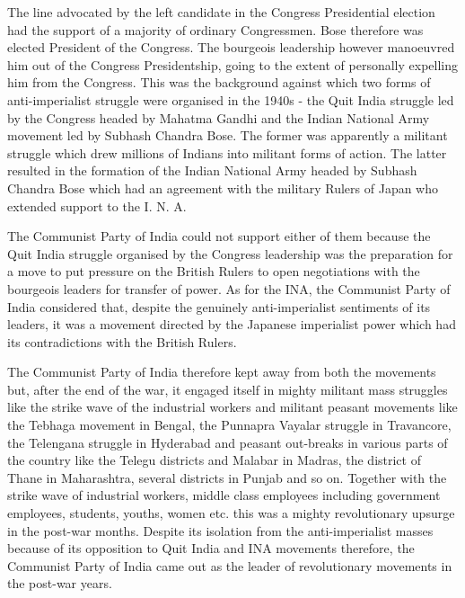 The line advocated by the left candidate in the Congress Presidential election had the support of a majority of ordinary Congressmen. Bose therefore was elected President of the Congress. The bourgeois leadership however manoeuvred him out of the Congress Presidentship, going to the extent of personally expelling him from the Congress. 
This was the background against which two forms of anti-imperialist struggle were organised in the 1940s - the Quit India struggle led by the Congress headed by Mahatma Gandhi and the Indian National Army movement led by Subhash Chandra Bose. The former was apparently a militant struggle which drew millions of Indians into militant forms of action. The latter 
resulted in the formation of the Indian National Army headed by Subhash Chandra Bose which had an agreement with the military Rulers of Japan who extended support to the I. N. A. 

The Communist Party of India could not support either of them because the Quit India struggle organised by the Congress leadership was the preparation for a move to put pressure on the British Rulers to open negotiations with the bourgeois leaders for transfer of power. As for the INA, the Communist Party of India considered that, despite the genuinely anti-imperialist sentiments of its leaders, it was a movement directed by the Japanese imperialist power which had its contradictions with the British Rulers. 

The Communist Party of India therefore kept away from both the movements but, after the end of the war, it engaged itself in mighty militant mass struggles like the strike wave of the industrial workers and militant peasant movements like the Tebhaga movement in Bengal, the Punnapra Vayalar struggle in Travancore, the Telengana struggle in Hyderabad and peasant 
out-breaks in various parts of the country like the Telegu districts and Malabar in Madras, the district of Thane in Maharashtra, several districts in Punjab and so on. Together with the strike wave of industrial workers, middle class employees including government employees, students, youths, women etc. this was a mighty revolutionary upsurge in the post-war months. Despite its isolation from the anti-imperialist masses because of its opposition to Quit India and INA movements therefore, the Communist Party of India came out as the leader of revolutionary movements in the post-war years. 

